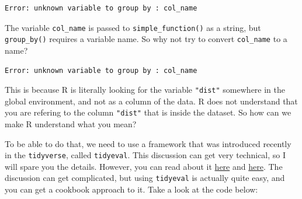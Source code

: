 \documentclass[]{gitbook}
\newenvironment{Shaded}{\begin{snugshade}}{\end{snugshade}}
\newcommand{\ControlFlowTok}[1]{\textcolor[rgb]{0.13,0.29,0.53}{\textbf{#1}}}
\newcommand{\DataTypeTok}[1]{\textcolor[rgb]{0.13,0.29,0.53}{#1}}
\newcommand{\KeywordTok}[1]{\textcolor[rgb]{0.13,0.29,0.53}{\textbf{#1}}}
\newcommand{\NormalTok}[1]{#1}
\newcommand{\OperatorTok}[1]{\textcolor[rgb]{0.81,0.36,0.00}{\textbf{#1}}}
\newcommand{\StringTok}[1]{\textcolor[rgb]{0.31,0.60,0.02}{#1}}
\begin{document}
\begin{verbatim}
Error: unknown variable to group by : col_name
\end{verbatim}

The variable \texttt{col\_name} is passed to \texttt{simple\_function()} as a string, but \texttt{group\_by()} requires a
variable name. So why not try to convert \texttt{col\_name} to a name?

\begin{Shaded}
\end{Shaded}

\begin{verbatim}
Error: unknown variable to group by : col_name
\end{verbatim}

This is because R is literally looking for the variable \texttt{"dist"} somewhere in the global
environment, and not as a column of the data. R does not understand that you are refering to the
column \texttt{"dist"} that is inside the dataset. So how can we make R understand what you mean?

To be able to do that, we need to use a framework that was introduced recently in the \texttt{tidyverse},
called \texttt{tidyeval}. This discussion can get very technical, so I will spare you the details.
However, you can read about it \href{http://dplyr.tidyverse.org/articles/programming.html}{here} and
\href{https://cran.r-project.org/web/packages/rlang/vignettes/tidy-evaluation.html}{here}. The
discussion can get complicated, but using \texttt{tidyeval} is actually quite easy, and you can get a
cookbook approach to it. Take a look at the code below:

\begin{Shaded}
\end{Shaded}
\end{document}

